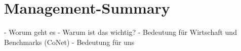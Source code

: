 \section{Management-Summary}

- Worum geht es 
- Warum ist das wichtig?
- Bedeutung für Wirtschaft und Benchmarks (CoNet)
- Bedeutung für uns